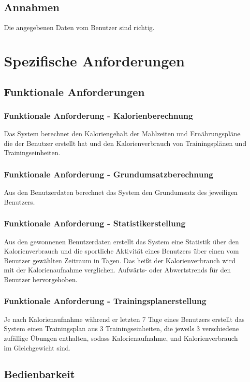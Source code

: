 \documentclass[12pt,a4paper,onecolumn]{article}
\begin{document}
\subsection{Annahmen}
Die angegebenen Daten vom Benutzer sind richtig.

\section{Spezifische Anforderungen}
\subsection{Funktionale Anforderungen}

\subsubsection{Funktionale Anforderung - Kalorienberechnung}
Das System berechnet den Kaloriengehalt der \gls{Mahlzeit}en und Ernährungspläne die der Benutzer erstellt hat und den Kalorienverbrauch von Trainingsplänen und Trainingseinheiten.
\subsubsection{Funktionale Anforderung - Grundumsatzberechnung}
Aus den Benutzerdaten berechnet das System den Grundumsatz des jeweiligen Benutzers.
\subsubsection{Funktionale Anforderung - Statistikerstellung}
Aus den gewonnenen Benutzerdaten erstellt das System eine Statistik über den Kalorienverbrauch und die sportliche Aktivität eines Benutzers über einen vom Benutzer gewählten Zeitraum in Tagen. Das heißt der Kalorienverbrauch wird mit der Kalorienaufnahme verglichen. Aufwärts- oder Abwertstrends für den Benutzer hervorgehoben.
\subsubsection{Funktionale Anforderung - Trainingsplanerstellung}
Je nach Kalorienaufnahme während er letzten 7 Tage eines Benutzers erstellt das System einen \gls{Trainingsplan} aus 3 Trainingseinheiten, die jeweils 3 verschiedene zufällige \gls{Übung}en enthalten, sodass Kalorienaufnahme, und Kalorienverbrauch im Gleichgewicht sind.


\subsection{Bedienbarkeit}
\end{document}

